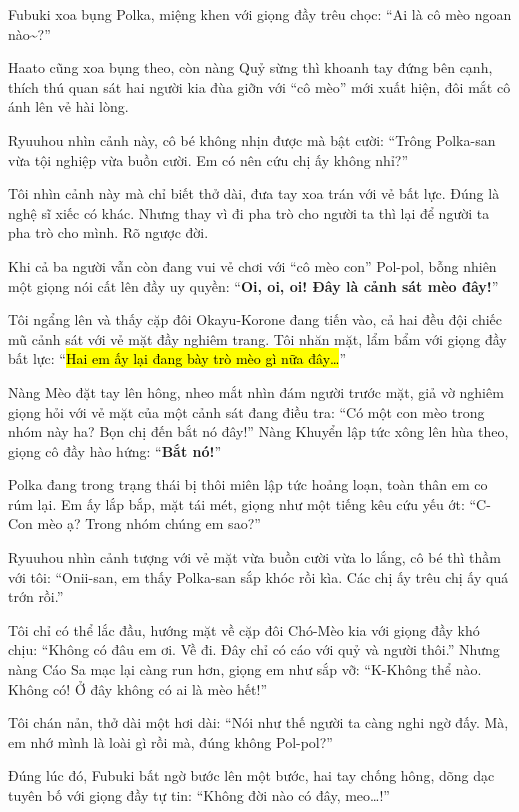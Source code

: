 \documentclass[../main.tex]{subfiles}
\begin{document}
Fubuki xoa bụng Polka, miệng khen với giọng đầy trêu chọc: ``Ai là cô mèo ngoan nào\~{}?''

Haato cũng xoa bụng theo, còn nàng Quỷ sừng thì khoanh tay đứng bên cạnh, thích thú quan sát hai người kia đùa giỡn với ``cô mèo'' mới xuất hiện, đôi mắt cô ánh lên vẻ hài lòng.

Ryuuhou nhìn cảnh này, cô bé không nhịn được mà bật cười: ``Trông Polka-san vừa tội nghiệp vừa buồn cười. Em có nên cứu chị ấy không nhỉ?''

Tôi nhìn cảnh này mà chỉ biết thở dài, đưa tay xoa trán với vẻ bất lực. Đúng là nghệ sĩ xiếc có khác. Nhưng thay vì đi pha trò cho người ta thì lại để người ta pha trò cho mình. Rõ ngược đời.


Khi cả ba người vẫn còn đang vui vẻ chơi với ``cô mèo con'' Pol-pol, bỗng nhiên một giọng nói cất lên đầy uy quyền: ``\textbf{Oi, oi, oi! Đây là cảnh sát mèo đây!}''

Tôi ngẩng lên và thấy cặp đôi Okayu-Korone đang tiến vào, cả hai đều đội chiếc mũ cảnh sát với vẻ mặt đầy nghiêm trang. Tôi nhăn mặt, lẩm bẩm với giọng đầy bất lực: ``\hl{Hai em ấy lại đang bày trò mèo gì nữa đây\dots}''


Nàng Mèo đặt tay lên hông, nheo mắt nhìn đám người trước mặt, giả vờ nghiêm giọng hỏi với vẻ mặt của một cảnh sát đang điều tra: ``Có một con mèo trong nhóm này ha? Bọn chị đến bắt nó đây!'' Nàng Khuyển lập tức xông lên hùa theo, giọng cô đầy hào hứng: ``\textbf{Bắt nó!}''

Polka đang trong trạng thái bị thôi miên lập tức hoảng loạn, toàn thân em co rúm lại. Em ấy lắp bắp, mặt tái mét, giọng như một tiếng kêu cứu yếu ớt: ``C-Con mèo ạ? Trong nhóm chúng em sao?''

Ryuuhou nhìn cảnh tượng với vẻ mặt vừa buồn cười vừa lo lắng, cô bé thì thầm với tôi: ``Onii-san, em thấy Polka-san sắp khóc rồi kìa. Các chị ấy trêu chị ấy quá trớn rồi.''

Tôi chỉ có thể lắc đầu, hướng mặt về cặp đôi Chó-Mèo kia với giọng đầy khó chịu: ``Không có đâu em ơi. Về đi. Đây chỉ có cáo với quỷ và người thôi.'' Nhưng nàng Cáo Sa mạc lại càng run hơn, giọng em như sắp vỡ: ``K-Không thể nào. Không có! Ở đây không có ai là mèo hết!''

Tôi chán nản, thở dài một hơi dài: ``Nói như thế người ta càng nghi ngờ đấy. Mà, em nhớ mình là loài gì rồi mà, đúng không Pol-pol?''

Đúng lúc đó, Fubuki bất ngờ bước lên một bước, hai tay chống hông, dõng dạc tuyên bố với giọng đầy tự tin: ``Không đời nào có đây, meo\dots!''
\end{document}
